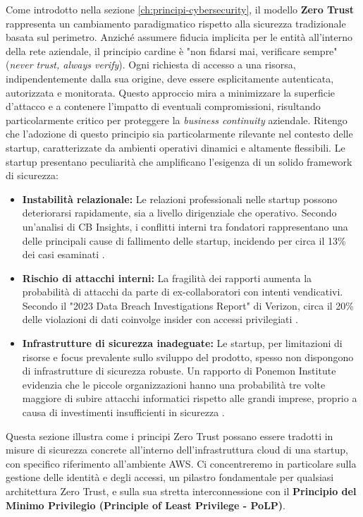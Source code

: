 Come introdotto nella sezione \ref{ch:principi-cybersecurity}, il modello \textbf{Zero Trust} rappresenta un cambiamento paradigmatico rispetto alla sicurezza tradizionale basata sul perimetro. Anziché assumere fiducia implicita per le entità all'interno della rete aziendale, il principio cardine è "non fidarsi mai, verificare sempre" (\textit{never trust, always verify}). Ogni richiesta di accesso a una risorsa, indipendentemente dalla sua origine, deve essere esplicitamente autenticata, autorizzata e monitorata. Questo approccio mira a minimizzare la superficie d'attacco e a contenere l'impatto di eventuali compromissioni, risultando particolarmente critico per proteggere la \textit{business continuity} aziendale. Ritengo che l'adozione di questo principio sia particolarmente rilevante nel contesto delle startup, caratterizzate da ambienti operativi dinamici e altamente flessibili. Le startup presentano peculiarità che amplificano l'esigenza di un solido framework di sicurezza:

\begin{itemize}
    \item \textbf{Instabilità relazionale:} Le relazioni professionali nelle startup possono deteriorarsi rapidamente, sia a livello dirigenziale che operativo. Secondo un'analisi di CB Insights, i conflitti interni tra fondatori rappresentano una delle principali cause di fallimento delle startup, incidendo per circa il 13\% dei casi esaminati \cite{CBInsights2023}. 
    \item \textbf{Rischio di attacchi interni:} La fragilità dei rapporti aumenta la probabilità di attacchi da parte di ex-collaboratori con intenti vendicativi. Secondo il "2023 Data Breach Investigations Report" di Verizon, circa il 20\% delle violazioni di dati coinvolge insider con accessi privilegiati \cite{Verizon2023}.
    \item \textbf{Infrastrutture di sicurezza inadeguate:} Le startup, per limitazioni di risorse e focus prevalente sullo sviluppo del prodotto, spesso non dispongono di infrastrutture di sicurezza robuste. Un rapporto di Ponemon Institute evidenzia che le piccole organizzazioni hanno una probabilità tre volte maggiore di subire attacchi informatici rispetto alle grandi imprese, proprio a causa di investimenti insufficienti in sicurezza \cite{Ponemon2023}.
\end{itemize}
Questa sezione illustra come i principi Zero Trust possano essere tradotti in misure di sicurezza concrete all'interno dell'infrastruttura cloud di una startup, con specifico riferimento all'ambiente AWS. Ci concentreremo in particolare sulla gestione delle identità e degli accessi, un pilastro fondamentale per qualsiasi architettura Zero Trust, e sulla sua stretta interconnessione con il \textbf{Principio del Minimo Privilegio (Principle of Least Privilege - PoLP)}.

